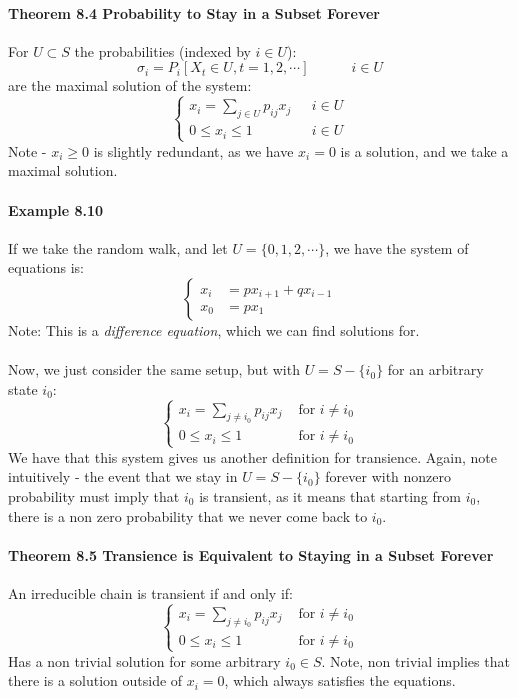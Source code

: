 \documentclass[12pt,a4paper]{article}
\newcommand{\1}[1]{\mathbbm{1}\left\{ #1 \right\}}
\begin{document}
\paragraph{Theorem 8.4 Probability to Stay in a Subset Forever} For $U \subset S$ the probabilities (indexed by $i \in U$):
$$
	\sigma_i = P_i\left[X_t \in U, t = 1, 2, \cdots\right] \quad\quad\quad i \in U
$$
are the maximal solution of the system:
$$
	\begin{cases}
	x_i = \sum_{j \in U} p_{ij} x_j & \text{ $i \in U$}\\
	0 \leq x_i \leq 1 & \text{ $i \in U$}
	\end{cases}
$$
Note - $x_i \geq 0$ is slightly redundant, as we have $x_i = 0$ is a solution, and we take a maximal solution. 

\paragraph{Example 8.10} If we take the random walk, and let $U = \{0,1,2, \cdots\}$, we have the system of equations is:
$$
	\begin{cases}
	x_i &= px_{i+1} + qx_{i-1}\\
	x_0 &= px_1
	\end{cases}
$$
Note: This is a \textit{difference equation}, which we can find solutions for.
\\\\
Now, we just consider the same setup, but with $U = S - \{i_0\}$ for an arbitrary state $i_0$:
$$
	\begin{cases}
	x_i = \sum_{j \neq i_0} p_{ij}x_j & \text{ for $i \neq i_0$}\\
	0 \leq x_i \leq 1 & \text{ for $i \neq i_0$}
	\end{cases}
$$
We have that this system gives us another definition for transience. Again, note intuitively - the event that we stay in $U = S - \{i_0\}$ forever with nonzero probability must imply that $i_0$ is transient, as it means that starting from $i_0$, there is a non zero probability that we never come back to $i_0$.

\paragraph{Theorem 8.5 Transience is Equivalent to Staying in a Subset Forever} An irreducible chain is transient if and only if:
$$
	\begin{cases}
	x_i = \sum_{j \neq i_0} p_{ij}x_j & \text{ for $i \neq i_0$}\\
	0 \leq x_i \leq 1 & \text{ for $i \neq i_0$}
	\end{cases}
$$
Has a non trivial solution for some arbitrary $i_0 \in S$. Note, non trivial implies that there is a solution outside of $x_i = 0$, which always satisfies the equations.
\end{document}
